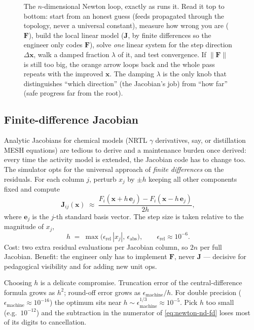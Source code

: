 \documentclass[11pt,a4paper]{article}
\newcommand{\xv}{\mathbf{x}}
\newcommand{\Fv}{\mathbf{F}}
\newcommand{\Jac}{\mathbf{J}}
\begin{document}
\begin{figure}[h]
\caption{The $n$-dimensional Newton loop, exactly as
 runs it.  Read it top to bottom: start
from an honest guess (feeds propagated through the topology, never a
universal constant), measure how wrong you are ($\Fv$), build the
local linear model ($\Jac$, by finite differences so the engineer only
codes $\Fv$), solve \emph{one} linear system for the step direction
$\Delta\xv$, walk a damped fraction $\lambda$ of it, and test
convergence.  If $\|\Fv\|$ is still too big, the orange arrow loops
back and the whole pass repeats with the improved $\xv$.  The damping
$\lambda$ is the only knob that distinguishes ``which direction''
(the Jacobian's job) from ``how far'' (safe progress far from the
root).}
\label{fig:newtonnd-flow}
\end{figure}

\subsection{Finite-difference Jacobian}

Analytic Jacobians for chemical models (NRTL $\gamma$ derivatives,
say, or distillation MESH equations) are tedious to derive and a
maintenance burden once derived: every time the activity model is
extended, the Jacobian code has to change too.  The simulator opts
for the universal approach of \emph{finite differences} on the
residuals.  For each column $j$, perturb $x_j$ by $\pm h$ keeping
all other components fixed and compute
\begin{equation}
   \Jac_{ij}(\xv) \;\approx\;
   \frac{F_i(\xv + h\,\mathbf{e}_j) - F_i(\xv - h\,\mathbf{e}_j)}{2h},
   \label{eq:newton-nd-fd}
\end{equation}
where $\mathbf{e}_j$ is the $j$-th standard basis vector.  The step
size is taken relative to the magnitude of $x_j$,
\[
   h \;=\; \max\!\bigl(\epsilon_{\mathrm{rel}}\,|x_j|,\,\epsilon_{\mathrm{abs}}\bigr),
   \qquad
   \epsilon_{\mathrm{rel}} \approx 10^{-6}.
\]
Cost: two extra residual evaluations per Jacobian column, so $2n$
per full Jacobian.  Benefit: the engineer only has to implement
$\Fv$, never $\Jac$ --- decisive for pedagogical visibility and for
adding new unit ops.

\begin{pitfall}
Choosing $h$ is a delicate compromise.  Truncation error of the
central-difference formula grows as $h^2$; round-off error grows as
$\epsilon_{\mathrm{machine}}/h$.  For double precision
($\epsilon_{\mathrm{machine}} \approx 10^{-16}$) the optimum sits near
$h \sim \epsilon_{\mathrm{machine}}^{1/3} \approx 10^{-5}$.  Pick $h$
too small (e.g.\ $10^{-12}$) and the subtraction in the numerator
of \eqref{eq:newton-nd-fd} loses most of its digits to cancellation.
\end{pitfall}
\end{document}
